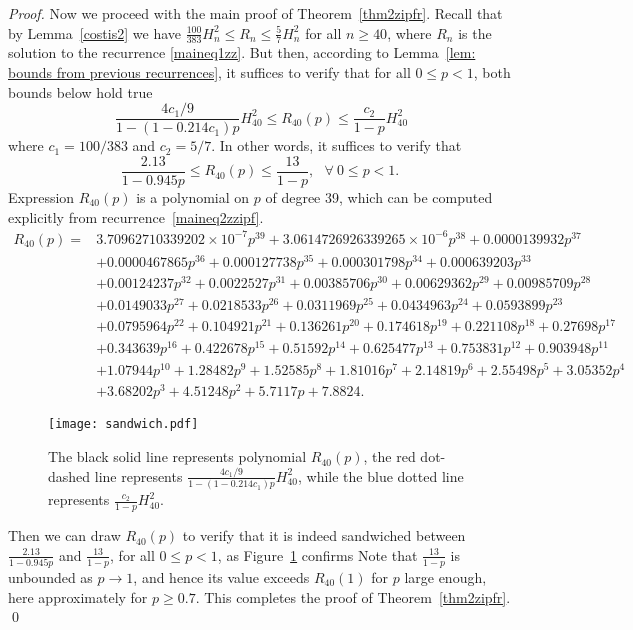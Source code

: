 \documentclass[11pt]{llncs}
\begin{document}
\begin{proof}
Now we proceed with the main proof of Theorem~\ref{thm2zipfr}.
Recall that by Lemma~\ref{costis2} we have $\frac{100}{383} H_n^2 \leq R_n \leq \frac57 H_n^2$ for all $n \geq 40$, where $R_n$ is the solution to the recurrence \eqref{maineq1zz}. But then, according to Lemma~\eqref{lem: bounds from previous recurrences}, it suffices to verify that for all $0 \leq p < 1$, both bounds below hold true
$$
~\frac{4c_1/9}{1-(1-0.214c_1)p} H_{40}^2 \leq R_{40}(p) \leq \frac{c_2}{1-p} H_{40}^2 
$$
where $c_1=100/383$ and $c_2=5/7$. In other words, it suffices to verify that 
$$
\frac{2.13}{1-0.945 p}
\leq R_{40}(p)
\leq 
\frac{13}{1-p}, ~~~\forall~ 0 \leq p < 1.
$$
Expression $R_{40}(p)$ is a polynomial on $p$ of degree 39, which can be computed explicitly from recurrence~\eqref{maineq2zzipf}. \begin{align*}
R_{40}(p)= &
3.70962710339202 \times 10^{-7} p^{39}
+3.0614726926339265\times 10^{-6} p^{38}
+0.0000139932 p^{37}\\
&+0.0000467865 p^{36}
+0.000127738 p^{35}+0.000301798 p^{34}+0.000639203 p^{33} \\
&+0.00124237 p^{32}+0.0022527 p^{31}+0.00385706 p^{30}
+0.00629362  p^{29} 
+0.00985709 p^{28}\\
&+0.0149033 p^{27}
+0.0218533 p^{26}
+0.0311969 p^{25}
+0.0434963 p^{24} 
+0.0593899 p^{23}\\
&+0.0795964 p^{22}
+0.104921 p^{21}
+0.136261 p^{20}
+0.174618 p^{19}
+0.221108 p^{18} 
+0.27698 p^{17} \\
&+0.343639 p^{16}
+0.422678 p^{15}
+0.51592 p^{14}
+0.625477 p^{13}
+0.753831 p^{12}
+0.903948 p^{11}\\
&+1.07944 p^{10} 
+1.28482 p^9
+1.52585 p^8+1.81016 p^7+2.14819 p^6+2.55498 p^5+3.05352 p^4 \\
&+3.68202 p^3+4.51248 p^2 
+5.7117 p+7.8824.
\end{align*}

\begin{figure}[!htb]
\begin{center}
\texttt{[image: sandwich.pdf]}\caption{The black solid line represents polynomial $R_{40}(p)$, the red dot-dashed line represents $\frac{4c_1/9}{1-(1-0.214c_1)p} H_{40}^2$, while the blue dotted line represents $\frac{c_2}{1-p} H_{40}^2$.}
\label{fig: sandwich R40}
\end{center}
\end{figure}
Then we can draw $R_{40}(p)$ to verify that it is indeed sandwiched between $\frac{2.13}{1-0.945 p}$ and $\frac{13}{1-p}$, for all $0 \leq p < 1$, as Figure~\ref{fig: sandwich R40} confirms 
Note that $\frac{13}{1-p}$ is unbounded as $p\rightarrow 1$, and hence its value exceeds $R_{40}(1)$ for $p$ large enough, here approximately for $p\geq 0.7$.
This completes the proof of Theorem~\ref{thm2zipfr}. \qed
\end{proof}
\end{document}
